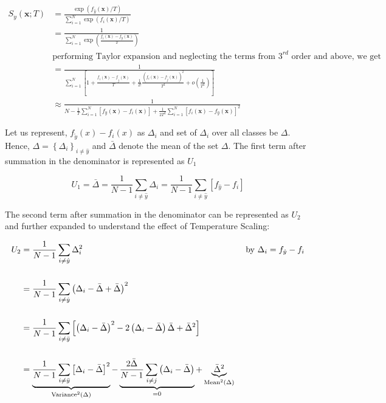     \begin{equation}
        \begin{aligned}
            S_{\dot{y}}(\boldsymbol{x} ; T) &=\frac{\exp \left(f_{\hat{y}}(\boldsymbol{x}) / T\right)}{\sum_{i=1}^{N} \exp \left(f_{i}(\boldsymbol{x}) / T\right)} \\
            &=\frac{1}{\sum_{i=1}^{N} \exp \left(\frac{f_{i}(\boldsymbol{x})-f_{y}(\boldsymbol{x})}{T}\right)} \\
            & \text {performing Taylor expansion and neglecting the terms from $3^{rd}$ order and above, we get} \\
            &=\frac{1}{\sum_{i=1}^{N}\left[1+\frac{f_{i}(\boldsymbol{x})-f_{\dot{j}}(\boldsymbol{x})}{T}+\frac{1}{2 !} \frac{\left(f_{i}(\boldsymbol{x})-f_{\hat{j}}(\boldsymbol{x})\right)^{2}}{T^{2}}+o\left(\frac{1}{T^{2}}\right)\right]} \\
            & \approx \frac{1}{N-\frac{1}{T} \sum_{i=1}^{N}\left[f_{\hat{y}}(\boldsymbol{x})-f_{i}(\boldsymbol{x})\right]+\frac{1}{2 T^{2}} \sum_{i=1}^{N}\left[f_{i}(\boldsymbol{x})-f_{\hat{y}}(\boldsymbol{x})\right]^{2}}
        \end{aligned}
        \label{Temperatue_effect}
    \end{equation}
    
    Let us represent, $f_{\tilde{y}}(x)-f_{i}(x)$ as $\Delta_{i}$ and set of $\Delta_{i}$ over all classes be $\Delta$. Hence, $\Delta=\left\{\Delta_{i}\right\}_{i \neq \hat{y}}$ and $\bar{\Delta}$ denote the mean of the set $\Delta$. The first term after summation in the denominator is represented as $U_{1}$
    
    \begin{equation}
        U_{1} = \bar{\Delta}=\frac{1}{N-1} \sum_{i \neq \hat{y}} \Delta_{i}=\frac{1}{N-1} \sum_{i \neq \hat{y}}\left[f_{\hat{y}}-f_{i}\right]
        \label{u1}
    \end{equation}
    
    The second term after summation in the denominator can be represented as $U_{2}$ and further expanded to understand the effect of Temperature Scaling:
    
    \begin{equation}
        \setlength{\jot}{10pt}
        \begin{aligned}
        U_{2} & =\frac{1}{N-1} \sum_{i \neq \hat{y}} \Delta_{i}^{2} & \text { by } \Delta_{i}=f_{\dot{y}}-f_{i} \\[7.5pt]
        & =\frac{1}{N-1} \sum_{i \neq \hat{y}}\left(\Delta_{i}-\bar{\Delta}+\bar{\Delta}\right)^{2} & \\[7.5pt]
        & =\frac{1}{N-1} \sum_{i \neq \bar{y}}\left[\left(\Delta_{i}-\bar{\Delta}\right)^{2}-2\left(\Delta_{i}-\bar{\Delta}\right) \bar{\Delta}+\bar{\Delta}^{2}\right] & \\[7.5pt]
        & =\underbrace{\frac{1}{N-1} \sum_{i \neq \bar{y}}\left[\Delta_{i}-\bar{\Delta}\right]^{2}}_{\operatorname{Variance}^{2}(\Delta)}-\underbrace{\frac{2 \bar{\Delta}}{N-1} \sum_{i \neq j}\left(\Delta_{i}-\bar{\Delta}\right)}_{=0}+\underbrace{\bar{\Delta}^{2}}_{\operatorname{Mean}^{2}(\Delta)}
        \end{aligned}
        \label{u2}
    \end{equation}
    
